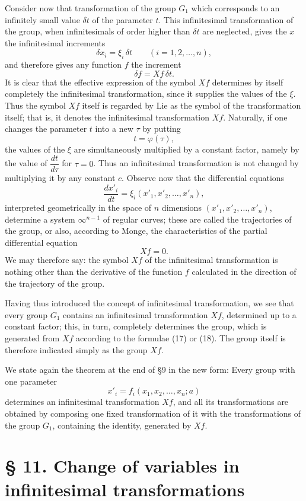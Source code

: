 \documentclass[11pt]{book}
\begin{document}
Consider now that transformation of the group $G_1$ which corresponds to an infinitely small value $\delta t$ of the parameter $t$. This infinitesimal transformation of the group, when infinitesimals of order higher than $\delta t$ are neglected, gives the $x$ the infinitesimal increments
\[
 \delta x_i=\xi_i\,\delta t\qquad (i=1,2,\ldots,n),
\]
and therefore gives any function $f$ the increment
\[
 \delta f=Xf\,\delta t.
\]
It is clear that the effective expression of the symbol $Xf$ determines by itself completely the infinitesimal transformation, since it supplies the values of the $\xi$. Thus the symbol $Xf$ itself is regarded by Lie as the symbol of the transformation itself; that is, it denotes the infinitesimal transformation $Xf$. Naturally, if one changes the parameter $t$ into a new $\tau$ by putting
\[
 t=\varphi(\tau),
\]
the values of the $\xi$ are simultaneously multiplied by a constant factor, namely by the value of $\dfrac{dt}{d\tau}$ for $\tau=0$. Thus an infinitesimal transformation is not changed by multiplying it by any constant $c$. Observe now that the differential equations
\[
 \frac{dx'_i}{dt}=\xi_i(x'_1,x'_2,\ldots,x'_n),
\]
interpreted geometrically in the space of $n$ dimensions $(x'_1,x'_2,\ldots,x'_n)$, determine a system $\infty^{n-1}$ of regular curves; these are called the trajectories of the group, or also, according to Monge, the characteristics of the partial differential equation
\[
 Xf=0.
\]
We may therefore say: the symbol $Xf$ of the infinitesimal transformation is nothing other than the derivative of the function $f$ calculated in the direction of the trajectory of the group.

Having thus introduced the concept of infinitesimal transformation, we see that every group $G_1$ contains an infinitesimal transformation $Xf$, determined up to a constant factor; this, in turn, completely determines the group, which is generated from $Xf$ according to the formulae (17) or (18). The group itself is therefore indicated simply as the group $Xf$.

We state again the theorem at the end of \S{}9 in the new form:
Every group with one parameter
\[
 x'_i=f_i(x_1,x_2,\ldots,x_n;a)
\]
determines an infinitesimal transformation $Xf$, and all its transformations are obtained by composing one fixed transformation of it with the transformations of the group $G_1$, containing the identity, generated by $Xf$.

\section*{\S{} 11. Change of variables in infinitesimal transformations}
\end{document}
